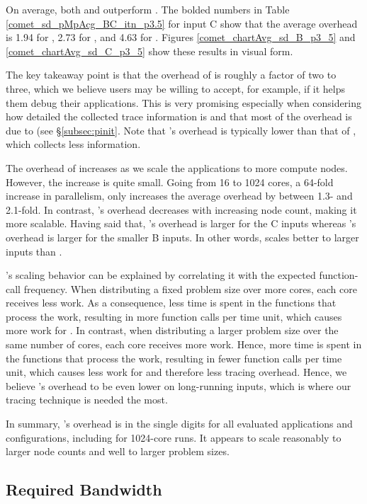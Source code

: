 On average, both \parlotm and \parlota outperform \callgrind. The bolded numbers in Table \ref{comet_sd_pMpAcg_BC_itn_p3.5} for input C show that the average overhead is 1.94 for \parlotm, 2.73 for \parlota, and 4.63 for \callgrind. Figures \ref{comet_chartAvg_sd_B_p3_5} and \ref{comet_chartAvg_sd_C_p3_5} show these results in visual form.


The key takeaway point is that the overhead of \parlot is roughly a factor of two to three, which we believe users may be willing to accept, for example, if it helps them debug their applications. This is very promising especially when considering how detailed the collected trace information is and that most of the overhead is due to \pin (see \S\ref{subsec:pinit}. Note that \parlot 's overhead is typically lower than that of \callgrind, which collects less information.

The overhead of \parlot increases as we scale the applications to more compute nodes. However, the increase is quite small. Going from 16 to 1024 cores, a 64-fold increase in parallelism, only increases the average overhead by between 1.3- and 2.1-fold. In contrast, \callgrind 's overhead decreases with increasing node count, making it more scalable. Having said that, \callgrind 's overhead is larger for the C inputs whereas \parlot 's overhead is larger for the smaller B inputs. In other words, \parlot scales better to larger inputs than \callgrind.

\parlot 's scaling behavior can be explained by correlating it with the expected function-call frequency. When distributing a fixed problem size over more cores, each core receives less work. As a consequence, less time is spent in the functions that process the work, resulting in more function calls per time unit, which causes more work for \parlot. In contrast, when distributing a larger problem size over the same number of cores, each core receives more work. Hence, more time is spent in the functions that process the work, resulting in fewer function calls per time unit, which causes less work for \parlot and therefore less tracing overhead. Hence, we believe \parlot 's overhead to be even lower on long-running inputs, which is where our tracing technique is needed the most.


In summary, \parlot 's overhead is in the single digits for all evaluated applications and configurations, including for 1024-core runs. It appears to scale reasonably to larger node counts and well to larger problem sizes.
  
\subsection{Required Bandwidth}
\label{subsec:lowbw}


